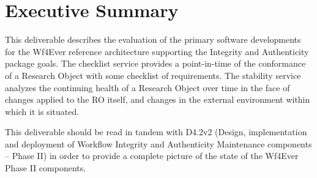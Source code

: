 \documentclass[a4paper, twoside, 11pt]{article}
\begin{document}
\section*{Executive Summary}
This deliverable describes the evaluation of the primary software developments for the Wf4Ever reference architecture supporting the Integrity and Authenticity package goals.  The checklist service provides a point-in-time of the conformance of a Research Object with some checklist of requirements.  The stability service analyzes the continuing health of a Research Object over time in the face of changes applied to the RO itself, and changes in the external environment within which it is situated.

This deliverable should be read in tandem with D4.2v2 (Design,
implementation and deployment of Workflow Integrity and Authenticity
Maintenance components -- Phase II) in order to provide a complete
picture of the state of the Wf4Ever Phase II components.

\clearpage

\tableofcontents
\clearpage

\clearpage
\sloppy


% 



% 


\appendix
\clearpage
{}


\label{lastpage}
\end{document}
